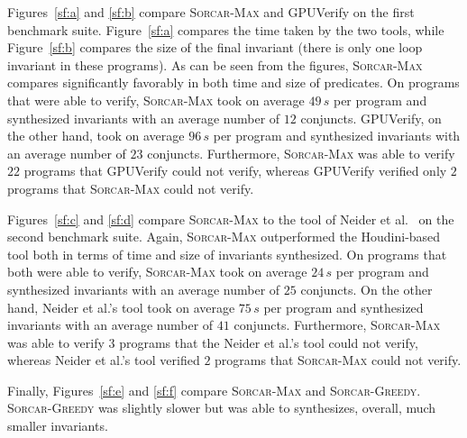 Figures~\ref{sf:a} and \ref{sf:b} compare \textsc{Sorcar-Max} and GPUVerify on the first benchmark suite.
Figure~\ref{sf:a} compares the time taken by the two tools, while Figure~\ref{sf:b} compares the size of the final invariant (there is only one loop invariant in these programs).
%
As can be seen from the figures, \textsc{Sorcar-Max} compares significantly favorably in both time and size of predicates.
On programs that were able to verify, \textsc{Sorcar-Max} took on average $49\,s$ per program and synthesized invariants with an average number of $12$ conjuncts.
GPUVerify, on the other hand, took on average $96\,s$ per program and synthesized invariants with an average number of $23$ conjuncts.
Furthermore, \textsc{Sorcar-Max} was able to verify $22$ programs that GPUVerify could not verify, whereas GPUVerify verified only $2$ programs that \textsc{Sorcar-Max} could not verify. 

Figures~\ref{sf:c} and \ref{sf:d} compare \textsc{Sorcar-Max} to the tool of Neider et al.~\cite{DBLP:conf/tacas/Neider0MS018} on the second benchmark suite.
Again, \textsc{Sorcar-Max} outperformed the Houdini-based tool both in terms of time and size of invariants synthesized.
On programs that both were able to verify, \textsc{Sorcar-Max} took on average $24\,s$ per program and synthesized invariants with an average number of $25$ conjuncts.
On the other hand, Neider et al.'s tool took on average $75\,s$ per program and synthesized invariants with an average number of $41$ conjuncts.
Furthermore, \textsc{Sorcar-Max} was able to verify $3$ programs that the Neider et al.'s tool could not verify, whereas Neider et al.'s tool verified $2$ programs that \textsc{Sorcar-Max} could not verify. 

Finally, Figures~\ref{sf:e} and \ref{sf:f} compare \textsc{Sorcar-Max} and \textsc{Sorcar-Greedy}.
\textsc{Sorcar-Greedy} was slightly slower but was able to synthesizes, overall, much smaller invariants. 






